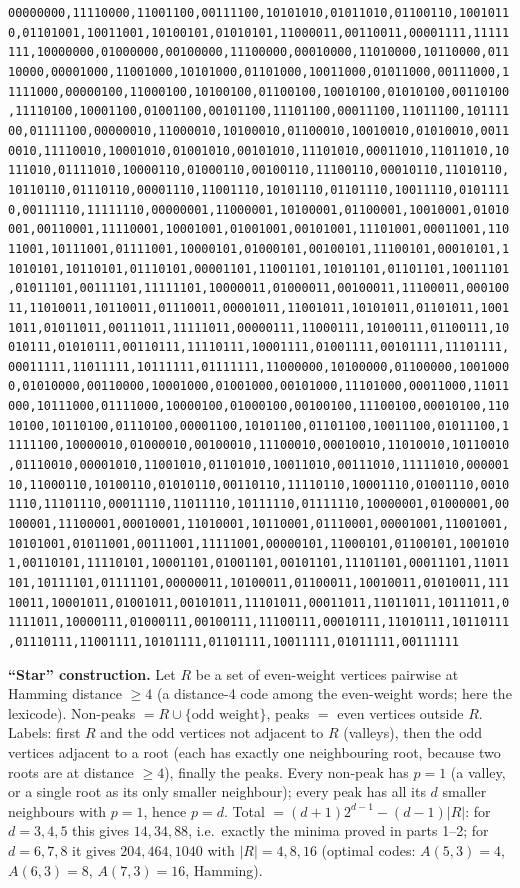 \texttt{00000000,11110000,11001100,00111100,10101010,01011010,01100110,10010110,01101001,10011001,10100101,01010101,11000011,00110011,00001111,11111111,10000000,01000000,00100000,11100000,00010000,11010000,10110000,01110000,00001000,11001000,10101000,01101000,10011000,01011000,00111000,11111000,00000100,11000100,10100100,01100100,10010100,01010100,00110100,11110100,10001100,01001100,00101100,11101100,00011100,11011100,10111100,01111100,00000010,11000010,10100010,01100010,10010010,01010010,00110010,11110010,10001010,01001010,00101010,11101010,00011010,11011010,10111010,01111010,10000110,01000110,00100110,11100110,00010110,11010110,10110110,01110110,00001110,11001110,10101110,01101110,10011110,01011110,00111110,11111110,00000001,11000001,10100001,01100001,10010001,01010001,00110001,11110001,10001001,01001001,00101001,11101001,00011001,11011001,10111001,01111001,10000101,01000101,00100101,11100101,00010101,11010101,10110101,01110101,00001101,11001101,10101101,01101101,10011101,01011101,00111101,11111101,10000011,01000011,00100011,11100011,00010011,11010011,10110011,01110011,00001011,11001011,10101011,01101011,10011011,01011011,00111011,11111011,00000111,11000111,10100111,01100111,10010111,01010111,00110111,11110111,10001111,01001111,00101111,11101111,00011111,11011111,10111111,01111111,11000000,10100000,01100000,10010000,01010000,00110000,10001000,01001000,00101000,11101000,00011000,11011000,10111000,01111000,10000100,01000100,00100100,11100100,00010100,11010100,10110100,01110100,00001100,10101100,01101100,10011100,01011100,11111100,10000010,01000010,00100010,11100010,00010010,11010010,10110010,01110010,00001010,11001010,01101010,10011010,00111010,11111010,00000110,11000110,10100110,01010110,00110110,11110110,10001110,01001110,00101110,11101110,00011110,11011110,10111110,01111110,10000001,01000001,00100001,11100001,00010001,11010001,10110001,01110001,00001001,11001001,10101001,01011001,00111001,11111001,00000101,11000101,01100101,10010101,00110101,11110101,10001101,01001101,00101101,11101101,00011101,11011101,10111101,01111101,00000011,10100011,01100011,10010011,01010011,11110011,10001011,01001011,00101011,11101011,00011011,11011011,10111011,01111011,10000111,01000111,00100111,11100111,00010111,11010111,10110111,01110111,11001111,10101111,01101111,10011111,01011111,00111111}


\textbf{``Star'' construction.} Let \(R\) be a set of even-weight
vertices pairwise at Hamming distance \(\ge4\) (a distance-4 code among
the even-weight words; here the lexicode). Non-peaks
\(=R\cup\{\text{odd weight}\}\), peaks \(=\) even vertices outside
\(R\). Labels: first \(R\) and the odd vertices not adjacent to \(R\)
(valleys), then the odd vertices adjacent to a root (each has exactly
one neighbouring root, because two roots are at distance \(\ge4\)),
finally the peaks. Every non-peak has \(p=1\) (a valley, or a single
root as its only smaller neighbour); every peak has all its \(d\)
smaller neighbours with \(p=1\), hence \(p=d\). Total
\(=(d+1)2^{d-1}-(d-1)|R|\): for \(d=3,4,5\) this gives \(14,34,88\),
i.e.~exactly the minima proved in parts 1--2; for \(d=6,7,8\) it gives
\(204,464,1040\) with \(|R|=4,8,16\) (optimal codes: \(A(5,3)=4\),
\(A(6,3)=8\), \(A(7,3)=16\), Hamming).

